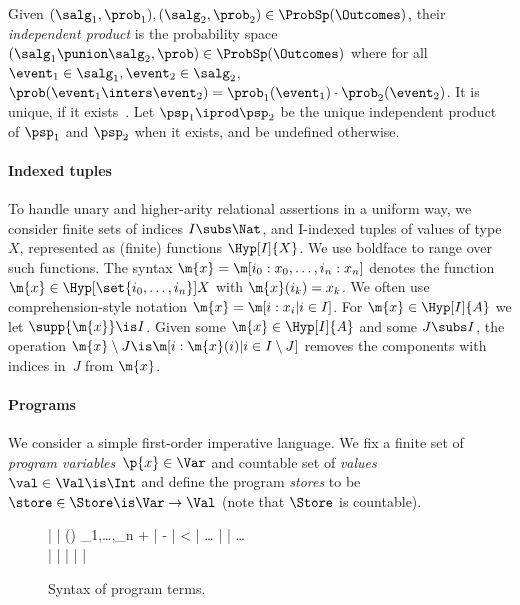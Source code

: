 \documentclass[acmsmall,nonacm,screen,appendix]{acmart}
\newenvironment{mathfig}[1][]{\begin{figure}[tp]\adjustfigure[#1]}{\end{figure}}
\begin{document}
\begin{definition}
\label{def:indep-comb}
  Given $ (\salg_1, \prob_1),(\salg_2, \prob_2) \in \ProbSp(\Outcomes) $,
  their \emph{independent product} is
  the probability space
  $(\salg_1 \punion \salg_2, \prob) \in \ProbSp(\Outcomes)$
  where for all~$ \event_1 \in \salg_1, \event_2 \in \salg_2 $,
  $
    \prob(\event_1 \inters \event_2) = \prob_1(\event_1) \cdot \prob_2(\event_2)
  $. It is unique, if it exists~\cite[Lemma 2.3]{lilac}. Let $ \psp_1 \iprod \psp_2 $ be the unique independent product
  of $\psp_1$ and $\psp_2$ when it exists, and be undefined otherwise.
\end{definition}





\paragraph{Indexed tuples}
To handle unary and higher-arity relational assertions in a uniform way,
we consider finite sets of indices $I \subs \Nat$,
and \pre I-indexed tuples of values of type~$X$,
represented as (finite) functions $\Hyp[I]{X}$.
We use boldface to range over such functions.
The syntax $ \m{x} = \m[i_0: x_0,\dots,i_n: x_n] $ denotes the function
$ \m{x} \in \Hyp[\set{i_0,\dots,i_n}]{X} $ with $\m{x}(i_k) = x_k$.
We often use comprehension-style notation \eg $\m{x} = \m[i: x_i | i\in I]$.
For $\m{x} \in \Hyp[I]{A}$ we let $\supp{\m{x}} \is I$.
Given some $ \m{x} \in \Hyp[I]{A} $ and some $J \subs I$,
the operation $ \m{x} \setminus J \is \m[i: \m{x}(i) | i \in I \setminus J] $
removes the components with indices in~$J$ from $\m{x}$.

\paragraph{Programs}
We consider a simple first-order imperative language.
We fix a finite set of \emph{program variables}~$\p{x} \in \Var$
and countable set of \emph{values}~$\val \in \Val \is \Int$
and define the program \emph{stores} to be
$ \store \in \Store \is \Var \to \Val $
(note that $\Store$ is countable).

\begin{mathfig}
  \begin{grammar}
\Expr \ni \expr \is
        \val |  | \prim(\vec{\expr})
    \qquad
    \vec{\expr} \grammIs \expr_1,\dots,\expr_n
    \qquad
    \prim \grammIs + | - | < | \dots
    \qquad
    \dist \grammIs {} |  | \dots
    \\
    \Term \ni \term \is
      | 
      | \Skip
| 
      | 
      | \Loop{\expr}{\term}
  \end{grammar}
  \caption{Syntax of program terms.}
  \label{fig:term-syntax}
\end{mathfig}
\end{document}

